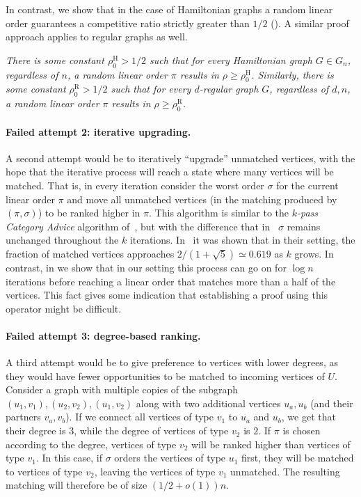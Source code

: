 In contrast, we show that in the case of Hamiltonian graphs a random linear order guarantees a competitive ratio strictly greater than $1/2$ ().
A similar proof approach applies to regular graphs as well.

\vspace{0.1in}
%
%
\emph{There is some constant $\rho_0^{\mathrm{H}} > 1/2$ such that for every Hamiltonian graph $G \in G_n$, regardless of $n$,
a random linear order $\pi$ results in $\rho \geq \rho_0^{\mathrm{H}}$.
Similarly, there is some constant $\rho_0^{\mathrm{R}} > 1/2$ such that for every $d$-regular graph $G$, regardless of $d,n$, a random linear order $\pi$ results in $\rho \geq \rho_0^{\mathrm{R}}$.}
\vspace{0.1in}

\paragraph*{Failed attempt 2: iterative upgrading.}
A second attempt would be to iteratively ``upgrade'' unmatched vertices, with the hope that the iterative process will reach a state where many vertices will be matched.
That is, in every iteration consider the worst order $\sigma$ for the current linear order $\pi$ and move all unmatched vertices (in the matching
%
produced %
by $(\pi,\sigma)$) to be ranked higher in $\pi$. This algorithm is similar to the \emph{$k$-pass Category Advice} algorithm of~\cite{Bor2017}, but with the difference that in~\cite{Bor2017} $\sigma$ remains unchanged throughout the $k$ iterations. In~\cite{Bor2017} it was shown that in their setting, the fraction of matched vertices approaches $2/(1 + \sqrt{5}) \simeq 0.619$ as $k$ grows. In contrast,
in  we show that in our setting this process can go on for $\log n$ iterations before reaching a linear order that matches more than a half of the vertices.
This fact gives some indication that establishing a proof using this operator might be difficult.

\paragraph*{Failed attempt 3: degree-based ranking.}
A third attempt would be to give preference to vertices with lower degrees, as they would have fewer opportunities to be matched to incoming vertices of $U$. %
Consider a graph with multiple copies of the subgraph $(u_1,v_1),(u_2,v_2),(u_1,v_2)$ along with two additional vertices $u_a,u_b$ (and their partners $v_a,v_b$). If we connect all vertices of type $v_1$ to $u_a$ and $u_b$, we get that their degree is $3$, while the degree of vertices of type $v_2$ is $2$. If $\pi$ is chosen according to the degree, vertices of type $v_2$ will be ranked higher than vertices of type $v_1$. In this case, if $\sigma$ orders the vertices of type $u_1$ first, they will be matched to vertices of type $v_2$, leaving the vertices of type $v_1$ unmatched. The resulting matching will therefore be of size $(1/2+o(1))n$.


